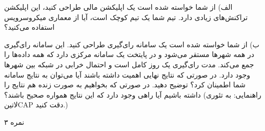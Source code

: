 \documentclass[../main.tex]{subfiles}
\begin{document}

الف) از شما خواسته شده است یک اپلیکشن مالی طراحی کنید، این اپلیکشن تراکنش‌های زیادی دارد. تیم شما یک تیم کوچک است، آیا از معماری میکروسرویس استفاده می‌کنید؟

ب) از شما خواسته شده است یک سامانه رای‌گیری طراحی کنید. این سامانه رای‌گیری در همه شهرها مستقر می‌شود و در پایتخت یک سامانه مرکزی دارد که همه داده‌ها را جمع می‌کند. مدت رای‌گیری یک روز کامل است و احتمال خرابی در شبکه بین شهرها وجود دارد. در صورتی که نتایج نهایی اهمیت داشته باشند آیا می‌توان به نتایج سامانه شما اطمینان کرد؟ توضیح دهید. در صورتی که بخواهیم به صورت زنده هم نتایج را داشته باشیم آیا راهی وجود دارد که این نتایج همواره صحیح باشند؟ (راهنمایی: به تئوری ‌لاتین{CAP} دقت کنید.)

۳ نمره
\end{document}
